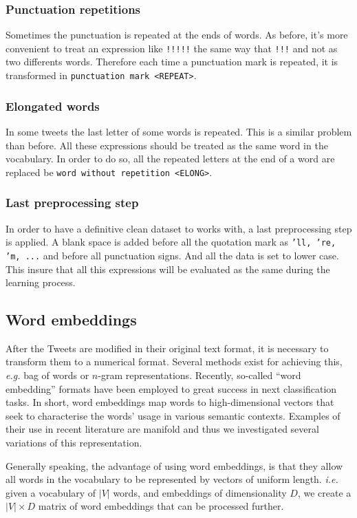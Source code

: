 \subsubsection{Punctuation repetitions}
Sometimes the punctuation is repeated at the ends of words. As before, it's more convenient to treat an expression like \texttt{!!!!!} the same way that \texttt{!!!} and not as two differents words. Therefore each time a punctuation mark is repeated, it is transformed in \texttt{punctuation mark <REPEAT>}. 

\subsubsection{Elongated words}
In some tweets the last letter of some words is repeated. This is a similar problem than before. All these expressions should be treated as the same word in the vocabulary. In order to do so, all the repeated letters at the end of a word are replaced be \texttt{word without repetition <ELONG>}.

\subsubsection{Last preprocessing step}
In order to have a definitive clean dataset to works with, a last preprocessing step is applied. A blank space is added before all the quotation mark as \texttt{'ll, 're, 'm, ...} and before all punctuation signs. And all the data is set to lower case. This insure that all this expressions will be evaluated as the same during the learning process.


\subsection{Word embeddings}
After the Tweets are modified in their original text format, it is necessary to transform them to a numerical format. Several methods exist for achieving this, \emph{e.g.} bag of words or $n$-gram representations. Recently, so-called ``word embedding'' formats \cite{} have been employed to great success in next classification tasks. In short, word embeddings map words to high-dimensional vectors that seek to characterise the words' usage in various semantic contexts. \cite{} Examples of their use in recent literature are manifold \cite{} and thus we investigated several variations of this representation.

Generally speaking, the advantage of using word embeddings, is that they allow all words in the vocabulary to be represented by vectors of uniform length. \emph{i.e.} given a vocabulary of $|V|$ words, and embeddings of dimensionality $D$, we create a $|V| \times D$ matrix of word embeddings that can be processed further.

